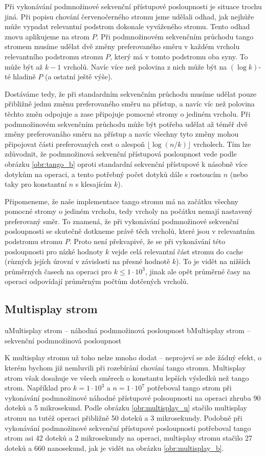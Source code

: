 Při vykonávání podmnožinové sekvenční přístupové posloupnosti je situace trochu
jiná. Při popisu chování červenočerného stromu jsme udělali odhad, jak nejhůře
může vypadat relevantní podstrom dokonale vyváženého stromu. Tento odhad znovu
aplikujeme na strom $P$. Při podmnožinovém sekvenčním průchodu tango stromem
musíme udělat dvě změny preferovaného směru v každém vrcholu relevantního
podstromu stromu $P$, který má v tomto podstromu oba syny. To může být až $k-1$
vrcholů. Navíc více než polovina z nich může být na $(\log k)$-té hladině $P$
(a ostatní ještě výše).

Dostáváme tedy, že při standardním sekvenčním průchodu musíme udělat pouze
přibližně jednu změnu preferovaného směru na přístup, a navíc víc než polovina
těchto změn odpojuje a zase připojuje pomocné stromy o jediném vrcholu. Při
podmnožinovém sekvenčním průchodu může být potřeba udělat až téměř dvě změny
preferovanáho směru na přístup a navíc všechny tyto změny mohou připojovat
části preferovaných cest o alespoň $\lfloor\log (n/k)\rfloor$ vrcholech. Tím
lze zdůvodnit, že podmnožinová sekvenční přístupová posloupnost vede podle obrázku \ref{obr:tango_b} oproti
standardní sekvenční přístupové k násobně více dotykům na operaci, a tento
potřebný počet dotyků dále s rostoucím $n$ (nebo taky pro konstantní $n$ s
klesajícím $k$). 

Připomeneme, že naše implementace tango stromu má na začátku všechny pomocné
stromy o jediném vrcholu, tedy vrcholy na počátku nemají nastavený preferovaný
směr. To znamená, že při vykonávání podmnožinové sekvenční posloupnosti se
skutečně dotkneme právě těch vrcholů, které jsou v relevantním podstromu stromu
$P$. Proto není překvapivé, že se při vykonávání této posloupnosti pro nízké
hodnoty $k$ vejde celá relevantní část stromu do cache (různých jejích úrovní v
závislosti na přesné hodnotě $k$). To je vidět na nižších průměrných časech na
operaci pro $k \leq 1\cdot 10^3$, jinak ale opět průměrné časy na operaci
odpovídají průměrným počtům dotčených vrcholů.

\subsection {Multisplay strom}

u{Multisplay strom -- náhodná podmnožinová posloupnost}
b{Multisplay strom -- sekvenční podmnožinová posloupnost}

K multisplay stromu už toho nelze mnoho dodat -- neprojeví se zde žádný efekt, o kterém bychom již nemluvili při rozebírání chování tango stromu. Multisplay strom však dosahuje ve všech směrech o konstantu lepších výsledků než tango strom. Například pro $k=1\cdot10^3$ a $n=1\cdot 10^7$ potřeboval tango strom při vykonávání podmnožinové náhodné přístupové polsoupnosti na operaci zhruba 90 doteků a 5 mikrosekund. Podle obrázku \ref{obr:multisplay_u} stačilo multisplay stromu na tutéž operaci přibližně 50 doteků a 3 mikrosekundy. Podobně při vykonávání podmnožinové sekvenční přístupové posloupnosti potřeboval tango strom asi 42 doteků a 2 mikrosekundy na operaci, multisplay stromu stačilo 27 doteků a 660 nanosekund, jak je vidět na obrázku \ref{obr:multisplay_b}.
